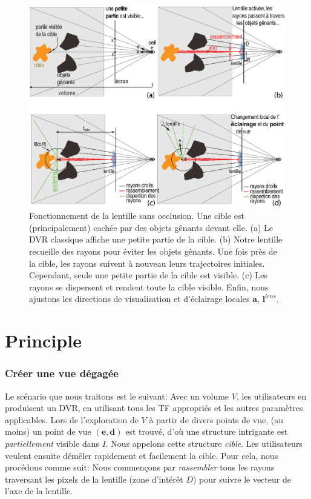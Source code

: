 \begin{figure}
\centering

\includegraphics [width=\textwidth]{images/principlefr.eps}

\caption[Fonctionnement de la lentille sans occlusion]{Fonctionnement de la lentille sans occlusion. Une cible est (principalement) cachée par des objets gênants devant elle. (a) Le DVR classique affiche une petite partie de la cible. (b) Notre lentille recueille des rayons pour éviter les objets gênants. Une fois près de la cible, les rayons suivent à nouveau leurs trajectoires initiales. Cependant, seule une petite partie de la cible est visible. (c) Les rayons se dispersent et  rendent toute la cible visible. Enfin, nous ajustons les directions de visualisation et d'éclairage locales $\mathbf{a}$, $\mathbf{l}^{lens}$.}
\label{f:fisheyefr}

\end{figure}
\section{Principle}
\label{sec:principle}


\subsubsection{Créer une vue dégagée}

Le scénario que nous traitons est le suivant: Avec un volume $ V $, les utilisateurs en produisent un DVR, en utilisant tous les TF appropriés et les autres paramètres applicables. Lors de l'exploration de $V$ à partir de divers points de vue, (au moins) un point de vue $ (\mathbf{e}, \mathbf{d}) $ est trouvé, d'où une structure intrigante est \emph{partiellement} visible dans $ I $. Nous appelons cette structure \emph{cible}. Les utilisateurs veulent ensuite démêler rapidement et facilement la cible. Pour cela, nous procédons comme suit: Nous commençons par \emph{rassembler} tous les rayons traversant les pixels de la lentille (zone d'intérêt $ D $) pour suivre le vecteur de l'axe de la lentille.

